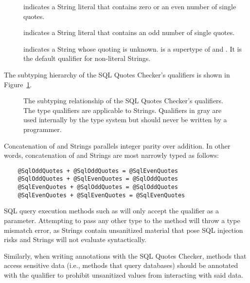 \begin{description}
\item[]
    indicates a String literal that contains zero or an even number of
    single quotes.
\item[]
    indicates a String literal that contains an odd number of single
    quotes.
\item[]
    indicates a String whose quoting is unknown.
     is a supertype of 
    and . It is the default qualifier for non-literal
    Strings.
\end{description}

The subtyping hierarchy of the SQL Quotes Checker's qualifiers is shown in
Figure~\ref{fig-sql-quotes-hierarchy}.

\begin{figure}
\caption{The subtyping relationship of the SQL Quotes Checker's qualifiers.
  The type qualifiers are applicable to Strings. Qualifiers in gray are
  used internally by the type system but should never be written by a programmer.}
\label{fig-sql-quotes-hierarchy}
\end{figure}


Concatenation of  and  Strings parallels
integer parity over addition. In other words, concatenation of 
and  Strings are most narrowly typed as follows:

\begin{verbatim}
    @SqlOddQuotes + @SqlOddQuotes = @SqlEvenQuotes
    @SqlOddQuotes + @SqlEvenQuotes = @SqlOddQuotes
    @SqlEvenQuotes + @SqlOddQuotes = @SqlOddQuotes
    @SqlEvenQuotes + @SqlEvenQuotes = @SqlEvenQuotes
\end{verbatim}

SQL query execution methods such as  will only accept
the  qualifier as a parameter. Attempting to pass any other type to
the method will throw a type mismatch error, as  Strings contain
unsanitized material that pose SQL injection risks and  Strings will not
evaluate syntactically.

Similarly, when writing annotations with the SQL Quotes Checker, methods that access
sensitive data (i.e., methods that query databases) should be annotated with the
 qualifier to prohibit unsanitized values from interacting with
said data.
